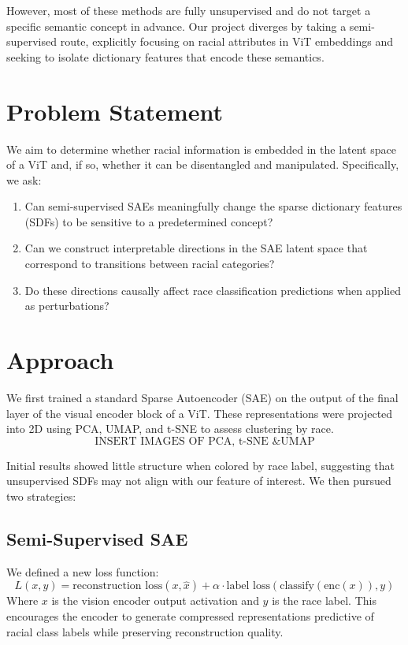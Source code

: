 \documentclass{article}
\begin{document}
However, most of these methods are fully unsupervised and do not target a specific semantic concept in advance. Our project diverges by taking a semi-supervised route, explicitly focusing on racial attributes in ViT embeddings and seeking to isolate dictionary features that encode these semantics.

\section{Problem Statement}
We aim to determine whether racial information is embedded in the latent space of a ViT and, if so, whether it can be disentangled and manipulated. Specifically, we ask:
\begin{enumerate}
\item Can semi-supervised SAEs meaningfully change the sparse dictionary features (SDFs) to be sensitive to a predetermined concept?
\item Can we construct interpretable directions in the SAE latent space that correspond to transitions between racial categories?
\item Do these directions causally affect race classification predictions when applied as perturbations?
\end{enumerate}

\section{Approach}
We first trained a standard Sparse Autoencoder (SAE) on the output of the final layer of the visual encoder block of a ViT. These representations were projected into 2D using PCA, UMAP, and t-SNE to assess clustering by race.
$$\text{INSERT IMAGES OF PCA, t-SNE \& UMAP}$$

Initial results showed little structure when colored by race label, suggesting that unsupervised SDFs may not align with our feature of interest. We then pursued two strategies:

\subsection{Semi-Supervised SAE}
We defined a new loss function:
\[
L(x, y) = \text{reconstruction loss}(x, \hat{x}) + \alpha \cdot \text{label loss}(\text{classify}(\text{enc}(x)), y)
\]
Where $x$ is the vision encoder output activation and $y$ is the race label. This encourages the encoder to generate compressed representations predictive of racial class labels while preserving reconstruction quality.
\end{document}
